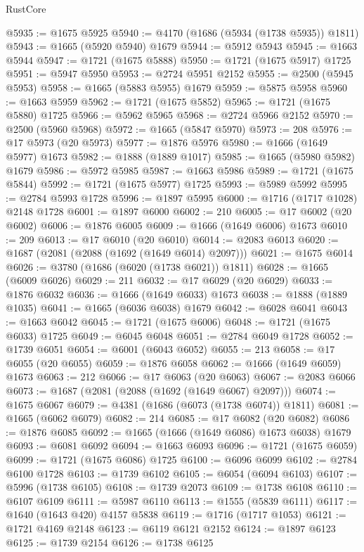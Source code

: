 \begin{lexlean}{RustCore}
\begin{coremodule}
@5935 := @1675 @5925
@5940 := @4170 (@1686 (@5934 (@1738 @5935)) @1811)
@5943 := @1665 (@5920 @5940) @1679
@5944 := @5912 @5943
@5945 := @1663 @5944
@5947 := @1721 (@1675 @5888)
@5950 := @1721 (@1675 @5917) @1725
@5951 := @5947 @5950
@5953 := @2724 @5951 @2152
@5955 := @2500 (@5945 @5953)
@5958 := @1665 (@5883 @5955) @1679
@5959 := @5875 @5958
@5960 := @1663 @5959
@5962 := @1721 (@1675 @5852)
@5965 := @1721 (@1675 @5880) @1725
@5966 := @5962 @5965
@5968 := @2724 @5966 @2152
@5970 := @2500 (@5960 @5968)
@5972 := @1665 (@5847 @5970)
@5973 := 208
@5976 := @17 @5973 (@20 @5973)
@5977 := @1876 @5976
@5980 := @1666 (@1649 @5977) @1673
@5982 := @1888 (@1889 @1017)
@5985 := @1665 (@5980 @5982) @1679
@5986 := @5972 @5985
@5987 := @1663 @5986
@5989 := @1721 (@1675 @5844)
@5992 := @1721 (@1675 @5977) @1725
@5993 := @5989 @5992
@5995 := @2784 @5993 @1728
@5996 := @1897 @5995
@6000 := @1716 (@1717 @1028) @2148 @1728
@6001 := @1897 @6000
@6002 := 210
@6005 := @17 @6002 (@20 @6002)
@6006 := @1876 @6005
@6009 := @1666 (@1649 @6006) @1673
@6010 := 209
@6013 := @17 @6010 (@20 @6010)
@6014 := @2083 @6013
@6020 := @1687 (@2081 (@2088 (@1692 (@1649 @6014) @2097)))
@6021 := @1675 @6014
@6026 := @3780 (@1686 (@6020 (@1738 @6021)) @1811)
@6028 := @1665 (@6009 @6026)
@6029 := 211
@6032 := @17 @6029 (@20 @6029)
@6033 := @1876 @6032
@6036 := @1666 (@1649 @6033) @1673
@6038 := @1888 (@1889 @1035)
@6041 := @1665 (@6036 @6038) @1679
@6042 := @6028 @6041
@6043 := @1663 @6042
@6045 := @1721 (@1675 @6006)
@6048 := @1721 (@1675 @6033) @1725
@6049 := @6045 @6048
@6051 := @2784 @6049 @1728
@6052 := @1739 @6051
@6054 := @6001 (@6043 @6052)
@6055 := 213
@6058 := @17 @6055 (@20 @6055)
@6059 := @1876 @6058
@6062 := @1666 (@1649 @6059) @1673
@6063 := 212
@6066 := @17 @6063 (@20 @6063)
@6067 := @2083 @6066
@6073 := @1687 (@2081 (@2088 (@1692 (@1649 @6067) @2097)))
@6074 := @1675 @6067
@6079 := @4381 (@1686 (@6073 (@1738 @6074)) @1811)
@6081 := @1665 (@6062 @6079)
@6082 := 214
@6085 := @17 @6082 (@20 @6082)
@6086 := @1876 @6085
@6092 := @1665 (@1666 (@1649 @6086) @1673 @6038) @1679
@6093 := @6081 @6092
@6094 := @1663 @6093
@6096 := @1721 (@1675 @6059)
@6099 := @1721 (@1675 @6086) @1725
@6100 := @6096 @6099
@6102 := @2784 @6100 @1728
@6103 := @1739 @6102
@6105 := @6054 (@6094 @6103)
@6107 := @5996 (@1738 @6105)
@6108 := @1739 @2073
@6109 := @1738 @6108
@6110 := @6107 @6109
@6111 := @5987 @6110
@6113 := @1555 (@5839 @6111)
@6117 := @1640 (@1643 @420) @4157 @5838
@6119 := @1716 (@1717 @1053)
@6121 := @1721 @4169 @2148
@6123 := @6119 @6121 @2152
@6124 := @1897 @6123
@6125 := @1739 @2154
@6126 := @1738 @6125

\end{coremodule}
\end{lexlean}
